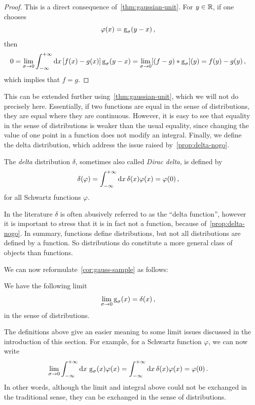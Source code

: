 \begin{proof}
	This is a direct consequence of~\cref{thm:gaussian-unit}. For $y\in\mathbb{R}$, if one chooses
	\begin{equation}
		\varphi(x)=\operatorname{g}_{\sigma}(y-x)\,,
	\end{equation}
	then
	\begin{equation}
		0=\lim_{\sigma\to 0}\int_{-\infty}^{+\infty}\mathrm{d}{x}\,[f(x)-g(x)]\operatorname{g}_{\sigma}(y-x)=
		\lim_{\sigma\to 0}[(f-g)\ast\operatorname{g}_{\sigma}](y)=f(y)-g(y)\,,
	\end{equation}
	which implies that $f=g$.
\end{proof}
This can be extended further using~\cref{thm:gaussian-unit}, which we will not do
precisely here. Essentially, if two functions are equal in the sense of distributions,
they are equal where they are continuous. However, it is easy to see that equality in the
sense of distributions is weaker than the usual equality, since changing the value of one
point in a function does not modify an integral. Finally, we define the delta
distribution, which address the issue raised by~\cref{prop:delta-nogo}.
\begin{definition}
	\label{def:delta}
	The \emph{delta} distribution $\delta$, sometimes also called \emph{Dirac delta}, is
	defined by
	\begin{equation}
		\delta(\varphi)=\int_{-\infty}^{+\infty}\mathrm{d}{x}\,\delta(x)\varphi(x)=\varphi(0)\,,
	\end{equation}
	for all Schwartz functions $\varphi$.
\end{definition}
In the literature $\delta$ is often abusively referred to as the ``delta function'',
however it is important to stress that it is in fact not a function, because
of~\cref{prop:delta-nogo}. In summary, functions define distributions, but not all
distributions are defined by a function. So distributions do constitute a more general
class of objects than functions.

We can now reformulate~\cref{cor:gauss-sample} as follows:
\begin{proposition}
	We have the following limit
	\begin{equation}
		\lim_{\sigma\to 0}\operatorname{g}_{\sigma}(x)=\delta(x)\,,
	\end{equation}
	in the sense of distributions.
\end{proposition}
The definitions above give an easier meaning to some limit issues discussed in the
introduction of this section. For example, for a Schwartz function $\varphi$, we can now
write
\begin{equation}
	\lim_{\sigma\to 0}\int_{-\infty}^{+\infty}\mathrm{d}{x}\,\operatorname{g}_{\sigma}(x)\varphi(x)=\int_{-\infty}^{+\infty}\mathrm{d}{x}\,\delta(x)\varphi(x)
	=\varphi(0)\,.
\end{equation}
In other words, although the limit and integral above could not be exchanged in the
traditional sense, they can be exchanged in the sense of distributions.
